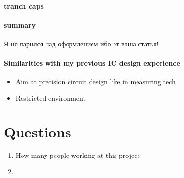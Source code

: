 \documentclass[a4paper,12pt]{article} %
\begin{document}
\paragraph{tranch caps}

\paragraph{summary} Я не парился над оформлением ибо эт ваша статья!


\paragraph{Similarities with my previous IC design experience}
\begin{itemize}
    \item Aim at precision circuit design like in measuring tech
    \item Restricted environment
\end{itemize}

\section{Questions}

\begin{enumerate}
    \item How many people working at this project
    \item 
\end{enumerate}
\end{document}
